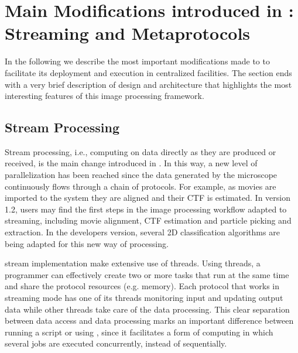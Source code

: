 \section{Main Modifications introduced in  \scipion: Streaming and Metaprotocols}
\label{overall}

In the following we describe the most important modifications made to \scipion to facilitate its deployment and execution in centralized facilities. The section ends with a very brief description of \scipion design and architecture that highlights the most interesting features of this image processing framework.

\subsection{Stream Processing}

Stream processing, i.e., computing on data directly as they are produced or received, is the main change introduced in \scipion. 
In this way, a new level of parallelization has been reached since the  data generated by the microscope continuously flows through a chain of protocols. For example, as movies are imported to the system they are aligned and their CTF is estimated. In \scipion version 1.2, users may find  the first steps in the image processing workflow adapted to streaming, including movie alignment,  CTF estimation and particle picking and extraction. In the developers version, several 2D classification algorithms are being adapted for this new way of processing.

\scipion stream implementation make extensive use of threads. %
Using threads, a programmer can effectively create two or more tasks that run at the same time and share the protocol resources (e.g. memory). 
Each protocol that works in streaming mode has one of its threads monitoring input and updating output  data while other threads take care of the data processing. This clear separation between data access and data processing marks an important difference between running a script or using \scipion, since it facilitates a form of computing in which several jobs are executed  concurrently, instead of sequentially. %

